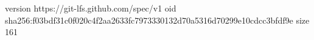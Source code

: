 version https://git-lfs.github.com/spec/v1
oid sha256:f03bdf31c0f020c4f2aa2633fc7973330132d70a5316d70299e10cdcc3bfdf9e
size 161
